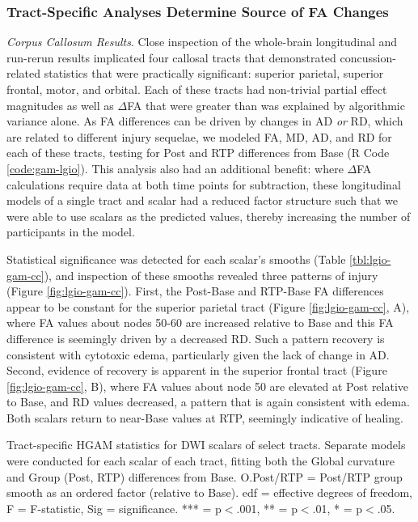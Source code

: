 \documentclass[12pt]{article}
\begin{document}
\subsubsection{Tract-Specific Analyses Determine Source of FA Changes}
\label{sssec:res-dwi-tract-tsa}
\textit{Corpus Callosum Results}. Close inspection of the whole-brain longitudinal and run-rerun results implicated four callosal tracts that demonstrated concussion-related statistics that were practically significant: superior parietal, superior frontal, motor, and orbital. Each of these tracts had non-trivial partial effect magnitudes as well as $\Delta$FA that were greater than was explained by algorithmic variance alone. As FA differences can be driven by changes in AD \textit{or} RD, which are related to different injury sequelae, we modeled FA, MD, AD, and RD for each of these tracts, testing for Post and RTP differences from Base (R Code \ref{code:gam-lgio}). This analysis also had an additional benefit: where $\Delta$FA calculations require data at both time points for subtraction, these longitudinal models of a single tract and scalar had a reduced factor structure such that we were able to use scalars as the predicted values, thereby increasing the number of participants in the model.

Statistical significance was detected for each scalar's smooths (Table \ref{tbl:lgio-gam-cc}), and inspection of these smooths revealed three patterns of injury (Figure \ref{fig:lgio-gam-cc}). First, the Post-Base and RTP-Base FA differences appear to be constant for the superior parietal tract (Figure \ref{fig:lgio-gam-cc}, A), where FA values about nodes 50-60 are increased relative to Base and this FA difference is seemingly driven by a decreased RD. Such a pattern recovery is consistent with cytotoxic edema, particularly given the lack of change in AD. Second, evidence of recovery is apparent in the superior frontal tract (Figure \ref{fig:lgio-gam-cc}, B), where FA values about node 50 are elevated at Post relative to Base, and RD values decreased, a pattern that is again consistent with edema. Both scalars return to near-Base values at RTP, seemingly indicative of healing.

\begin{table}[H]
	\scriptsize
	
	\caption{Tract-specific HGAM statistics for DWI scalars of select tracts. Separate models were conducted for each scalar of each tract, fitting both the Global curvature and Group (Post, RTP) differences from Base. O.Post/RTP = Post/RTP group smooth as an ordered factor (relative to Base). edf = effective degrees of freedom, F = F-statistic, Sig = significance. *** = p$<$.001, ** = p$<$.01, * = p$<$.05.}
	\label{tbl:lgio-gam-cc}
\end{table}
\end{document}
